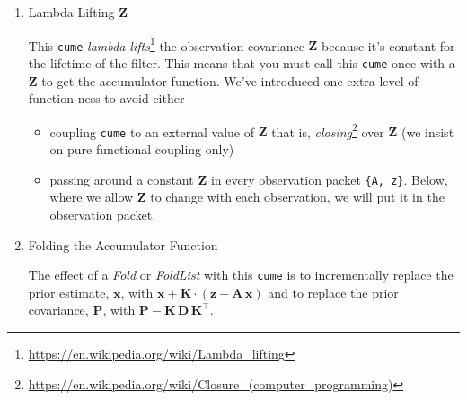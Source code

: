 \documentclass[10pt,oneside,x11names]{article}
\begin{document}
\begin{enumerate}
\noindent In all examples in this paper, the observations \(\mathbold{z}\) are
\(1\times{1}\) matrices, equivalent to scalars, so \(b=1\), but the theory and code
carry over to multi-dimensional vector observations.

We can see \emph{by inspection} that the dimensions of the 
estimate\footnote{We sometimes use the center dot or the \(\times\) symbols to clarify
matrix multiplication. They have no other significance and we can always write
matrix multiplication just by juxtaposing the matrices.}
\(\mathbold{x}+\mathbold{K}\cdot(\mathbold{z}-\mathbold{A}\,\mathbold{x})\)
and the  covariance
\(\mathbold{P}-\mathbold{K}\,\mathbold{D}\,\mathbold{K}^\intercal\) are minimal
and correct.
This ``correct-by-inspection'' formulation is invaluable for checking
mathematics and code.

\item Lambda Lifting \(\mathbold{Z}\)
\label{sec:orgheadline14}

This \texttt{cume} \emph{lambda lifts}\footnote{\url{https://en.wikipedia.org/wiki/Lambda_lifting}} the observation covariance \(\mathbold{Z}\) because
it's constant for the lifetime of the filter. This means that you must
call this \texttt{cume} once with a \(\mathbold{Z}\) to get the accumulator function.
We've introduced one extra level of function-ness to avoid either
\begin{itemize}
\item coupling \texttt{cume} to an external value of \(\mathbold{Z}\) that is,
\emph{closing}\footnote{\url{https://en.wikipedia.org/wiki/Closure_(computer_programming)}} over \(\mathbold{Z}\) (we insist on pure functional coupling
only)
\item passing around a constant \(\mathbold{Z}\) in every observation packet \texttt{\{A, z\}}.
Below, where we allow \(\mathbold{Z}\) to change with each observation, we will
put it in the observation packet.
\end{itemize}

\item Folding the Accumulator Function
\label{sec:orgheadline15}

The effect of a \emph{Fold} or \emph{FoldList} with this \texttt{cume} is to incrementally
replace the prior estimate, \(\mathbold{x}\), with 
\(\mathbold{x} +
\mathbold{K}\cdot
\left(
\mathbold{z}- 
\mathbold{A}\, 
\mathbold{x} 
\right)\) 
and to replace the prior covariance, \(\mathbold{P}\), with 
\(\mathbold{P}-
\mathbold{K}\,
\mathbold{D}\,
\mathbold{K}^\intercal\). 


\end{enumerate}
\end{document}
